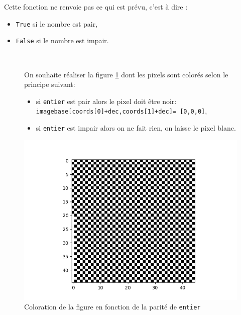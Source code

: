 Cette fonction ne renvoie pas ce qui est prévu, c'est à dire :
\begin{itemize}
 \item \texttt{True} si le nombre est pair,
 \item \texttt{False} si le nombre est impair.
\end{itemize}


~\

\begin{figure}[!ht]
\begin{minipage}{0.45\linewidth}
On souhaite réaliser la figure \ref{fig02} dont les pixels sont colorés selon le principe suivant:
\begin{itemize}
 \item si \texttt{entier} est pair alors le pixel doit être noir:\\ \texttt{imagebase[coords[0]+dec,coords[1]+dec]=
 [0,0,0]},
 \item si \texttt{entier} est impair alors on ne fait rien, on laisse le pixel blanc.
\end{itemize}
\end{minipage}\hfill
\begin{minipage}{0.45\linewidth}
\centering\includegraphics[width=0.9\linewidth]{img/fig02}
\caption{\label{fig02} Coloration de la figure en fonction de la parité de \texttt{entier}}
\end{minipage}
\end{figure}


